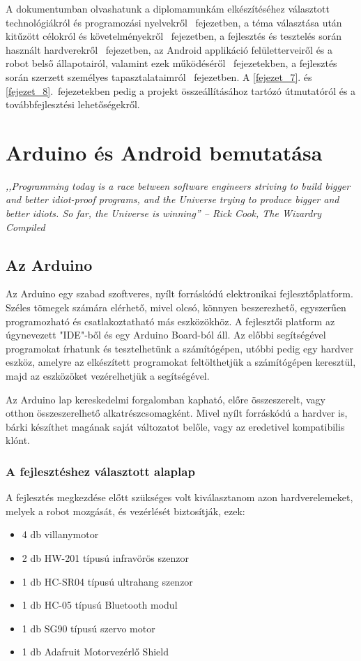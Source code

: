 \documentclass[]{thesis-ekf}
\theoremstyle{definition}
\begin{document}
A dokumentumban olvashatunk a diplomamunkám elkészítéséhez választott technológiákról és programozási nyelvekről ~fejezetben, a téma választása után kitűzött célokról és követelményekről ~fejezetben, a fejlesztés és tesztelés során használt hardverekről ~fejezetben, az Android applikáció felületterveiről és a robot belső állapotairól, valamint ezek működéséről ~fejezetekben, a fejlesztés során szerzett személyes tapasztalataimról ~fejezetben. A \ref{fejezet_7}. és \ref{fejezet_8}.~fejezetekben pedig a projekt összeállításához tartózó útmutatóról és a továbbfejlesztési lehetőségekről.
\chapter{Arduino és Android bemutatása}\label{fejezet_1}
\emph{,,Programming today is a race between software engineers striving to build bigger and better idiot-proof programs, and the Universe trying to produce bigger and better idiots. So far, the Universe is winning'' -- Rick Cook, The Wizardry Compiled}
\section{Az Arduino}
Az Arduino\cite{Arduino} egy szabad szoftveres, nyílt forráskódú elektronikai fejlesztőplatform. Széles tömegek számára elérhető, mivel olcsó, könnyen beszerezhető, egyszerűen programozható és csatlakoztatható más eszközökhöz. A fejlesztői platform az úgynevezett "IDE"-ből és egy Arduino Board-ból áll. Az előbbi segítségével programokat írhatunk és tesztelhetünk a számítógépen, utóbbi pedig egy hardver eszköz, amelyre az elkészített programokat feltölthetjük a számítógépen keresztül, majd az eszközöket vezérelhetjük a segítségével.

Az Arduino lap kereskedelmi forgalomban kapható, előre összeszerelt, vagy otthon összeszerelhető alkatrészcsomagként. Mivel nyílt forráskódú a hardver is, bárki készíthet magának saját változatot belőle, vagy az eredetivel kompatibilis klónt.
\subsection{A fejlesztéshez választott alaplap}\label{arduino_alaplap}
A fejlesztés megkezdése előtt szükséges volt kiválasztanom azon hardverelemeket, melyek a robot mozgását, és vezérlését biztosítják, ezek:
\begin{itemize}
	\item 4 db villanymotor
	\item 2 db HW-201 típusú infravörös szenzor
	\item 1 db HC-SR04 típusú ultrahang szenzor
	\item 1 db HC-05 típusú Bluetooth modul
	\item 1 db SG90 típusú szervo motor
	\item 1 db Adafruit Motorvezérlő Shield
\end{itemize}
\end{document}
